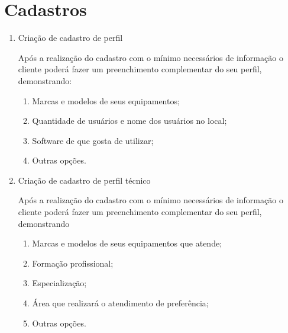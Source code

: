\section{Cadastros}

	\begin{enumerate}
		
		\item 
		Criação de cadastro de perfil
		
		Após a realização do cadastro com o mínimo necessários de informação o cliente poderá fazer um preenchimento complementar do seu perfil, demonstrando:
		
			\begin{enumerate}
				
				\item 
				Marcas e modelos de seus equipamentos;
				
				\item
				Quantidade de usuários e nome dos usuários no local;
				
				\item
				Software de que gosta de utilizar;
				
				\item
				Outras opções.
				
			\end{enumerate}
		
		\item 
		Criação de cadastro de perfil técnico
		
		Após a realização do cadastro com o mínimo necessários de informação o cliente poderá fazer um preenchimento complementar do seu perfil, demonstrando
		
			\begin{enumerate}
				
				\item
				Marcas e modelos de seus equipamentos que atende;
				
				\item
				Formação profissional;
				
				\item
				Especialização;
				
				\item
				Área que realizará o atendimento de preferência;
				
				\item
				Outras opções. 
				
			\end{enumerate}

	\end{enumerate}

